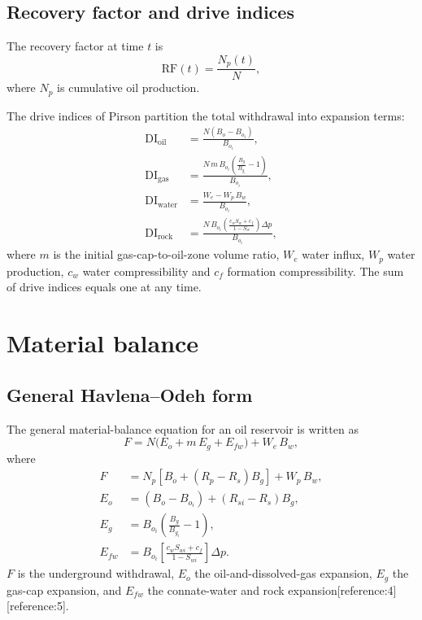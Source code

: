 \documentclass[10pt,a4paper]{article}
\newcommand{\bo}{B_o}
\newcommand{\bw}{B_w}
\newcommand{\bg}{B_g}
\newcommand{\rs}{R_s}
\begin{document}
\subsection{Recovery factor and drive indices}

The recovery factor at time $t$ is
\begin{equation}
  \mathrm{RF}(t) = \frac{N_p(t)}{N},
  \label{eq:rf}
\end{equation}
where $N_p$ is cumulative oil production.

The drive indices of Pirson partition the total withdrawal into expansion
terms:
\begin{align}
  \mathrm{DI}_{\mathrm{oil}} &= \frac{N(\bo-\bo_i)}{\bo_i}, \\
  \mathrm{DI}_{\mathrm{gas}} &= \frac{N\,m\,\bo_i\!\left(\frac{\bg}{\bg_i}-1\right)}{\bo_i}, \\
  \mathrm{DI}_{\mathrm{water}} &= \frac{W_e - W_p\,\bw}{\bo_i}, \\
  \mathrm{DI}_{\mathrm{rock}} &= \frac{N\,\bo_i\!\left(\frac{c_w S_w + c_f}{1-S_w}\right)\Delta p}{\bo_i},
\end{align}
where $m$ is the initial gas-cap-to-oil-zone volume ratio, $W_e$ water influx,
$W_p$ water production, $c_w$ water compressibility and $c_f$ formation
compressibility. The sum of drive indices equals one at any time.

\section{Material balance}

\subsection{General Havlena--Odeh form}

The general material-balance equation for an oil reservoir is written as
\begin{equation}
  F = N\bigl(E_o + m\,E_g + E_{fw}\bigr) + W_e\,\bw,
  \label{eq:mbe}
\end{equation}
where
\begin{align}
  F &= N_p\!\left[\bo + (R_p-\rs)\bg\right] + W_p\,\bw, \label{eq:F}\\
  E_o &= (\bo-\bo_i) + (R_{si}-\rs)\bg, \label{eq:Eo}\\
  E_g &= \bo_i\!\left(\frac{\bg}{\bg_i}-1\right), \label{eq:Eg}\\
  E_{fw} &= \bo_i\!\left[\frac{c_w S_{wi}+c_f}{1-S_{wi}}\right]\Delta p. \label{eq:Efw}
\end{align}
$F$ is the underground withdrawal, $E_o$ the oil-and-dissolved-gas expansion,
$E_g$ the gas-cap expansion, and $E_{fw}$ the connate-water and rock
expansion[reference:4][reference:5].
\end{document}

